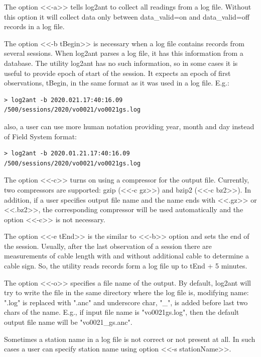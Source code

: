 \documentclass [10pt,letterpaper]{report}
\begin{document}
The option <<-a>> tells log2ant to collect all
readings from a log file. Without this option it will collect data only between
data\_valid=on and data\_valid=off records in a log file.

The option <<-b tBegin>> is necessary when a log file contains records from several
sessions. When log2ant parses a log file, it has this information from a database.
The utility log2ant has no such information, so in some cases it is useful to provide
epoch of start of the session. It expects an epoch of first observations, tBegin, in the
same format as it was used in a log file. E.g.:
\begin{verbatim}
> log2ant -b 2020.021.17:40:16.09 /500/sessions/2020/vo0021/vo0021gs.log
\end{verbatim}

\noindent
also, a user can use more human notation providing year, month and day instead of
Field System format:

\begin{verbatim}
> log2ant -b 2020.01.21.17:40:16.09 /500/sessions/2020/vo0021/vo0021gs.log
\end{verbatim}

The option <<-c>> turns on using a compressor for the output file. Currently, two
compressors are supported: gzip (<<-c gz>>) and bzip2 (<<-c bz2>>). In addition, if
a user specifies output file name and the name ends with <<.gz>> or <<.bz2>>,
the corresponding compressor will be used automatically and the option <<-c>> is
not necessary.

The option <<-e tEnd>> is the similar to <<-b>> option and sets the end of the session.
Usually, after the last observation of a session there are measurements of cable length
with and without additional cable to determine a cable sign. So, the utility reads records
form a log file up to tEnd + 5 minutes.


The option <<-o>> specifies a file name of the output. By default, log2ant will try
to write the file in the same directory where the log file is, modifying name:
".log" is replaced with ".anc" and underscore char, "\_", is added before last two
chars of the name. E.g., if input file name is "vo0021gs.log", then the default
output file name will be "vo0021\_gs.anc".

Sometimes a station name in a log file is not correct or not present at all. In such cases
a user can specify station name using option <<-s stationName>>.
\end{document}
